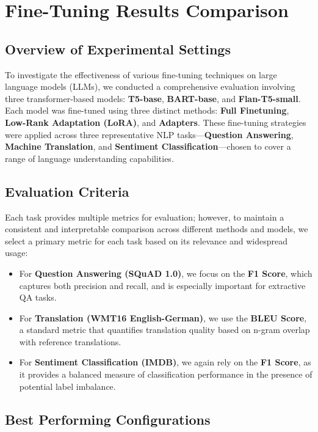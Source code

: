 \section{Fine-Tuning Results Comparison}

\subsection{Overview of Experimental Settings}

To investigate the effectiveness of various fine-tuning techniques on large language models (LLMs), we conducted a comprehensive evaluation involving three transformer-based models: \textbf{T5-base}, \textbf{BART-base}, and \textbf{Flan-T5-small}. Each model was fine-tuned using three distinct methods: \textbf{Full Finetuning}, \textbf{Low-Rank Adaptation (LoRA)}, and \textbf{Adapters}. These fine-tuning strategies were applied across three representative NLP tasks—\textbf{Question Answering}, \textbf{Machine Translation}, and \textbf{Sentiment Classification}—chosen to cover a range of language understanding capabilities.

\subsection{Evaluation Criteria}

Each task provides multiple metrics for evaluation; however, to maintain a consistent and interpretable comparison across different methods and models, we select a primary metric for each task based on its relevance and widespread usage:

\begin{itemize}
    \item For \textbf{Question Answering (SQuAD 1.0)}, we focus on the \textbf{F1 Score}, which captures both precision and recall, and is especially important for extractive QA tasks.
    \item For \textbf{Translation (WMT16 English-German)}, we use the \textbf{BLEU Score}, a standard metric that quantifies translation quality based on n-gram overlap with reference translations.
    \item For \textbf{Sentiment Classification (IMDB)}, we again rely on the \textbf{F1 Score}, as it provides a balanced measure of classification performance in the presence of potential label imbalance.
\end{itemize}

\subsection{Best Performing Configurations}

